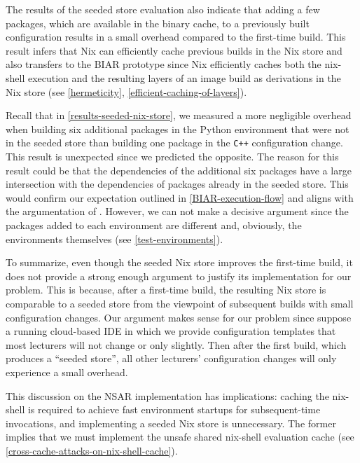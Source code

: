 The results of the seeded store evaluation also indicate that adding a few packages, which are available in the binary cache, to a previously built configuration results in a small overhead compared to the first-time build. This result infers that Nix can efficiently cache previous builds in the Nix store and also transfers to the BIAR prototype since Nix efficiently caches both the nix-shell execution and the resulting layers of an image build as derivations in the Nix store (see \ref{hermeticity}, \ref{efficient-caching-of-layers}).

Recall that in \ref{results-seeded-nix-store}, we measured a more negligible overhead when building six additional packages in the Python environment that were not in the seeded store than building one package in the \verb|C++| configuration change. This result is unexpected since we predicted the opposite. The reason for this result could be that the dependencies of the additional six packages have a large intersection with the dependencies of packages already in the seeded store. This would confirm our expectation outlined in \ref{BIAR-execution-flow} and aligns with the argumentation of \cite{Christensen2018}. However, we can not make a decisive argument since the packages added to each environment are different and, obviously, the environments themselves (see \ref{test-environments}). 

To summarize, even though the seeded Nix store improves the first-time build, it does not provide a strong enough argument to justify its implementation for our problem. This is because, after a first-time build, the resulting Nix store is comparable to a seeded store from the viewpoint of subsequent builds with small configuration changes. Our argument makes sense for our problem since suppose a running cloud-based IDE in which we provide configuration templates that most lecturers will not change or only slightly. Then after the first build, which produces a ``seeded store'', all other lecturers' configuration changes will only experience a small overhead.

This discussion on the NSAR implementation has implications: caching the nix-shell is required to achieve fast environment startups for subsequent-time invocations, and implementing a seeded Nix store is unnecessary. The former implies that we must implement the unsafe shared nix-shell evaluation cache (see \ref{cross-cache-attacks-on-nix-shell-cache}). %

